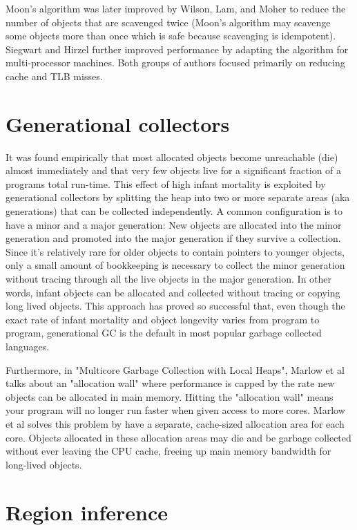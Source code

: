 \documentclass[a4paper,oneside]{memoir}
\begin{document}
Moon's algorithm was later improved by Wilson, Lam, and Moher to reduce the
number of objects that are scavenged twice (Moon's algorithm may scavenge
some objects more than once which is safe because scavenging is idempotent).
\cite{Lam:1992}
Siegwart and Hirzel further improved performance by adapting the algorithm for
multi-processor machines.\cite{Siegwart:2006} Both groups of authors focused primarily on reducing
cache and TLB misses.

\section{Generational collectors}

It was found empirically that most allocated objects become unreachable (die)
almost immediately and that very few objects live for a significant fraction
of a programs total run-time.\cite{Courts:1988,Appel:1989} This effect of high infant mortality is exploited
by generational collectors by splitting the heap into two or more separate areas
(aka generations) that can be collected independently. A common configuration is
to have a minor and a major generation: New objects are allocated into the minor
generation and promoted into the major generation if they survive a collection.
Since it's relatively rare for older objects to contain pointers to younger
objects, only a small amount of bookkeeping is necessary to collect the minor
generation without tracing through all the live objects in the major generation.\cite{Appel:1989}
In other words, infant objects can be allocated and collected without tracing or
copying long lived objects. This approach has proved so successful that, even
though the exact rate of infant mortality and object longevity varies from
program to program, generational GC is the default in most popular garbage
collected languages.

Furthermore, in "Multicore Garbage Collection with Local Heaps", Marlow et al talks
about an "allocation wall" where performance is capped by the rate new objects
can be allocated in main memory.\cite{Marlow:2011} Hitting the "allocation wall" means your
program will no longer run faster when given access to more cores. Marlow et al
solves this problem by have a separate, cache-sized allocation area for each core.
Objects allocated in these allocation areas may die and be garbage collected
without ever leaving the CPU cache, freeing up main memory bandwidth for
long-lived objects.

\section{Region inference}
\end{document}
